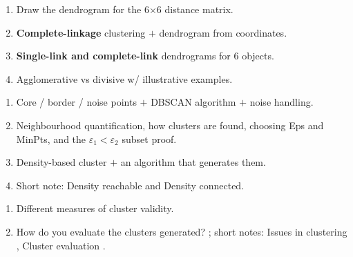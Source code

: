 \begin{enumerate}[start=13]
  \item {} Draw the dendrogram for the 6$\times$6 distance matrix. \hfill {} 
  \item {} \textbf{Complete-linkage} clustering $+$ dendrogram from coordinates. \hfill {} 
  \item {} \textbf{Single-link and complete-link} dendrograms for 6 objects. \hfill {} 
  \item {} Agglomerative vs divisive w/ illustrative examples. \hfill {} 
\end{enumerate}

\begin{enumerate}[start=17]
  \item {} Core / border / noise points $+$ DBSCAN algorithm $+$ noise handling.
        \hfill {}       
  \item {} Neighbourhood quantification, how clusters are found, choosing Eps and MinPts,
        and the $\varepsilon_1 < \varepsilon_2$ subset proof. \hfill {} 
  \item {} Density-based cluster $+$ an algorithm that generates them.
        \hfill {}   
  \item {} Short note: Density reachable and Density connected. \hfill {} 
\end{enumerate}

\begin{enumerate}[start=21]
  \item {} Different measures of cluster validity. \hfill {} 
  \item {} How do you evaluate the clusters generated? \hfill {} ;
        short notes: Issues in clustering , Cluster evaluation . \hfill {}
\end{enumerate}

